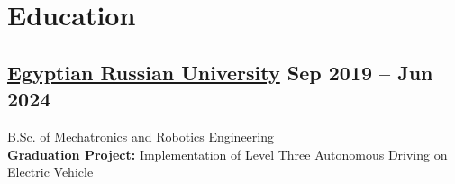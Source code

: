 \section*{Education}
%
%
%
\subsection*{
	\href{https://www.eru.edu.eg/}{Egyptian Russian University}
	\hspace*{\fill}
	\smallFormat Sep 2019 -- Jun 2024
}
B.Sc. of Mechatronics and Robotics Engineering\\
\textbf{Graduation Project:} Implementation of Level Three Autonomous Driving on Electric Vehicle
